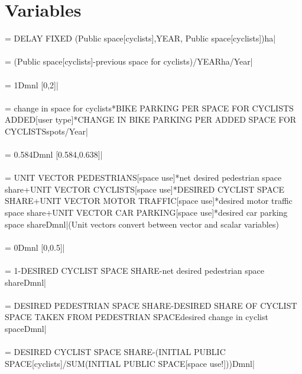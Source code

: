\section*{Variables}
 = {\small  DELAY FIXED (Public space[cyclists],YEAR, Public space[cyclists])ha|} \\ \\ 
 = {\small (Public space[cyclists]-previous space for cyclists)/YEARha/Year|} \\ \\ 
 = {\small 1Dmnl [0,2]|} \\ \\ 
 = {\small change in space for cyclists*BIKE PARKING PER SPACE FOR CYCLISTS ADDED[user type]*CHANGE IN BIKE PARKING PER ADDED SPACE FOR CYCLISTSspots/Year|} \\ \\ 
 = {\small 0.584Dmnl [0.584,0.638]|} \\ \\ 
 = {\small UNIT VECTOR PEDESTRIANS[space use]*net desired pedestrian space share+UNIT VECTOR CYCLISTS[space use]*DESIRED CYCLIST SPACE SHARE+UNIT VECTOR MOTOR TRAFFIC[space use]*desired motor traffic space share+UNIT VECTOR CAR PARKING[space use]*desired car parking space shareDmnl|}{\small  (Unit vectors convert between vector and scalar variables)} \\ \\ 
 = {\small 0Dmnl [0,0.5]|} \\ \\ 
 = {\small 1-DESIRED CYCLIST SPACE SHARE-net desired pedestrian space shareDmnl|} \\ \\ 
 = {\small DESIRED PEDESTRIAN SPACE SHARE-DESIRED SHARE OF CYCLIST SPACE TAKEN FROM PEDESTRIAN SPACE\*desired change in cyclist spaceDmnl|} \\ \\ 
 = {\small DESIRED CYCLIST SPACE SHARE-(INITIAL PUBLIC SPACE[cyclists]/SUM(INITIAL PUBLIC SPACE[space use!]))Dmnl|} \\ \\ 
